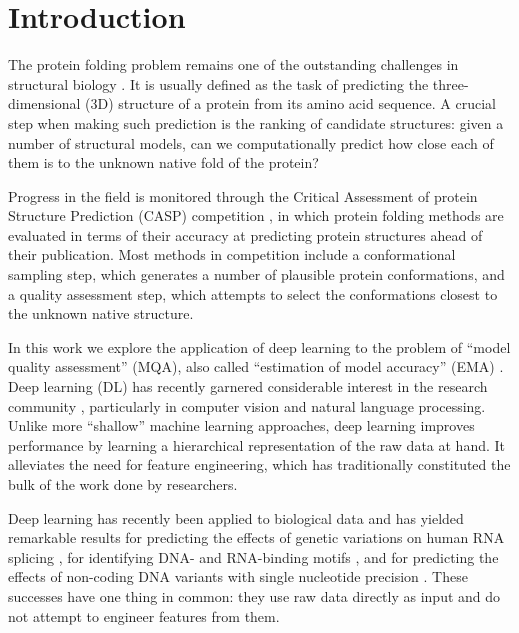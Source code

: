 \documentclass{bioinfo}
\begin{document}
\maketitle

\section{Introduction}

The protein folding problem remains one of the outstanding challenges
in structural biology \citep{dill2012folding}.  It is usually defined
as the task of predicting the three-dimensional (3D) structure of a
protein from its amino acid sequence. A crucial step when making such
prediction is the ranking of candidate structures: given a number of
structural models, can we computationally predict how close each of
them is to the unknown native fold of the protein?

Progress in the field is monitored through the Critical Assessment of
protein Structure Prediction (CASP) competition \citep{moult1995large},
in which protein folding methods are evaluated in terms of their
accuracy at predicting protein structures ahead of their
publication. Most methods in competition include a conformational
sampling step, which generates a number of plausible protein
conformations, and a quality assessment step, which attempts to select
the conformations closest to the unknown native structure.

In this work we explore the application of deep learning to the
problem of ``model quality assessment'' (MQA), also called
``estimation of model accuracy'' (EMA) \citep{kryshtafovych2015}. Deep
learning (DL) has recently garnered considerable interest in the
research community \citep{lecun2015deep}, particularly in computer
vision and natural language processing. Unlike more ``shallow''
machine learning approaches, deep learning improves performance by
learning a hierarchical representation of the raw data at hand. It
alleviates the need for feature engineering, which has traditionally
constituted the bulk of the work done by researchers.

Deep learning has recently been applied to biological data and has
yielded remarkable results for predicting the effects of genetic
variations on human RNA splicing \citep{xiong2015human}, for
identifying DNA- and RNA-binding
motifs \citep{alipanahi2015predicting}, and for predicting the effects
of non-coding DNA variants with single nucleotide
precision \citep{zhou2015predicting}. These successes have one thing in
common: they use raw data directly as input and do not attempt to
engineer features from them.
\end{document}
